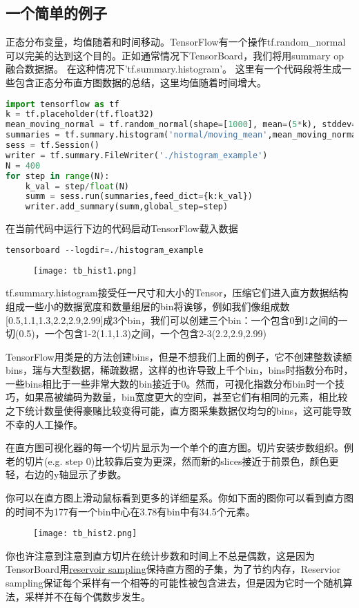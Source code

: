 \subsection{一个简单的例子}
正态分布变量，均值随着和时间移动。TensorFlow有一个操作tf.random\_normal可以完美的达到这个目的。正如通常情况下TensorBoard，我们将用summary op融合数据据。
在这种情况下'tf.summary.histogram'。
这里有一个代码段将生成一些包含正态分布直方图数据的总结，这里均值随着时间增大。
\begin{lstlisting}[language=Python]
import tensorflow as tf
k = tf.placeholder(tf.float32)
mean_moving_normal = tf.random_normal(shape=[1000], mean=(5*k), stddev=1)
summaries = tf.summary.histogram('normal/moving_mean',mean_moving_normal)
sess = tf.Session()
writer = tf.summary.FileWriter('./histogram_example')
N = 400
for step in range(N):
    k_val = step/float(N)
    summ = sess.run(summaries,feed_dict={k:k_val})
    writer.add_summary(summ,global_step=step)
\end{lstlisting}
在当前代码中运行下边的代码启动TensorFlow载入数据
\begin{lstlisting}[language=Python]
tensorboard --logdir=./histogram_example
\end{lstlisting}
\begin{center}
\begin{figure}[H]
\texttt{[image: tb\_hist1.png]}
\end{figure}
\end{center}
tf.summary.histogram接受任一尺寸和大小的Tensor，压缩它们进入直方数据结构组成一些小的数据宽度和数量组层的bin将诶够，例如我们像组成数[0.5,1.1,1.3,2.2,2.9,2.99]成3个bin，我们可以创建三个bin：一个包含0到1之间的一切(0.5)，一个包含1-2(1.1,1.3)之间，一个包含2-3(2.2,2.9,2.99)

  TensorFlow用类是的方法创建bins，但是不想我们上面的例子，它不创建整数读额bins，瑞与大型数据，稀疏数据，这样的也许导致上千个bin，bins时指数分布时，一些bins相比于一些非常大数的bin接近于0。然而，可视化指数分布bin时一个技巧，如果高被编码为数量，bin宽度更大的空间，甚至它们有相同的元素，相比较之下统计数量使得豪赌比较变得可能，直方图采集数据仅均匀的bins，这可能导致不幸的人工操作。

在直方图可视化器的每一个切片显示为一个单个的直方图。切片安装步数组织。例老的切片(e.g. step 0)比较靠后变为更深，然而新的slices接近于前景色，颜色更轻，右边的y轴显示了步数。

你可以在直方图上滑动鼠标看到更多的详细星系。你如下面的图你可以看到直方图的时间不为177有一个bin中心在3.78有bin中有34.5个元素。
\begin{center}
\begin{figure}[H]
\texttt{[image: tb\_hist2.png]}
\end{figure}
\end{center}
你也许注意到注意到直方切片在统计步数和时间上不总是偶数，这是因为TensorBoard用\href{https://en.wikipedia.org/wiki/Reservoir\_sampling}{reservoir sampling}保持直方图的子集，为了节约内存，Reservior sampling保证每个采样有一个相等的可能性被包含进去，但是因为它时一个随机算法，采样并不在每个偶数步发生。
